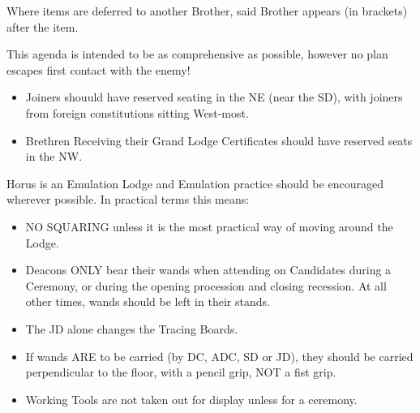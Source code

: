 \documentclass{lodgebrand}
\begin{document}
\renewcommand{\contentsname}{Agenda}
{\small\tableofcontents}

\newpage
{}
Where items are deferred to another Brother, said Brother appears (in brackets) after the item.

This agenda is intended to be as comprehensive as possible, however no plan escapes first contact with the enemy!

\begin{itemize}
  \item Joiners shouuld have reserved seating in the NE (near the SD), with joiners from foreign constitutions sitting West-most.
  \item Brethren Receiving their Grand Lodge Certificates should have reserved seats in the NW.
\end{itemize}

Horus is an Emulation Lodge and Emulation practice should be encouraged wherever possible. In practical terms this means:
\begin{itemize}
  \item NO SQUARING unless it is the most practical way of moving around the Lodge.
  \item Deacons ONLY bear their wands when attending on Candidates during a Ceremony, or during the opening procession and closing recession. At all other times, wands should be left in their stands.
  \item The JD alone changes the Tracing Boards.
  \item If wands ARE to be carried (by DC, ADC, SD or JD), they should be carried perpendicular to the floor, with a pencil grip, NOT a fist grip.
  \item Working Tools are not taken out for display unless for a ceremony.
\end{itemize}
\clearpage
\SetRunningTop{22mm}
\EnableRunningHeader
\AgendaReset
{}



\end{document}

